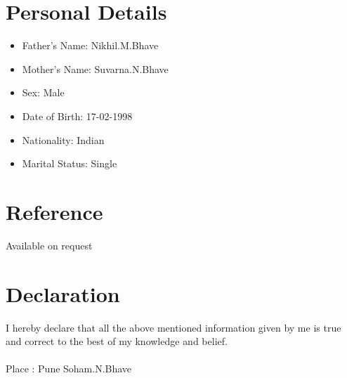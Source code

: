 \documentclass[margin,line]{res}
\begin{document}
\begin{resume}
\section{\sc Personal Details}
\begin{itemize}
	\item Father's Name: Nikhil.M.Bhave
	\item Mother's Name: Suvarna.N.Bhave
	\item Sex: Male
	\item Date of Birth: 17-02-1998
	\item Nationality: Indian
	\item Marital Status: Single
\end{itemize}

\section{\sc Reference}
Available on request

\section{\sc Declaration}
I hereby declare that all the above mentioned information given by me is true and correct to the best of my knowledge and belief. \\\
\\
Place : Pune     
\hspace{10cm}       
Soham.N.Bhave

\end{resume}
\end{document}
